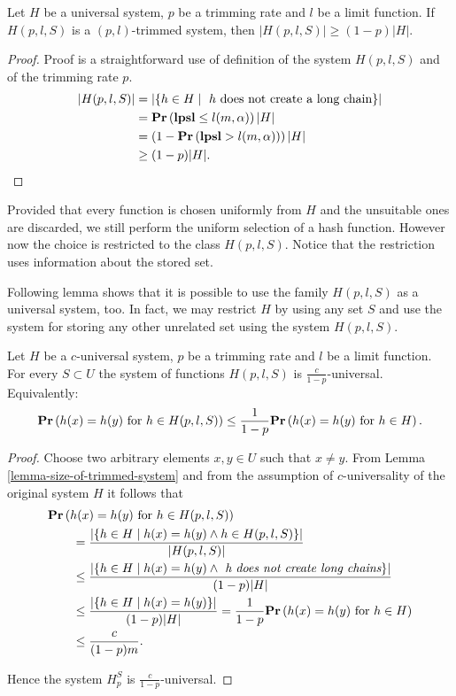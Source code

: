 \begin{lemma}
\label{lemma-size-of-trimmed-system}
Let $H$ be a universal system, $p$ be a trimming rate and $l$ be a limit function. If $H(p, l, S)$ is a $(p, l)$-trimmed system, then $|H(p, l, S)| \geq (1 - p)|H|$.
\end{lemma}
\begin{proof}
Proof is a straightforward use of definition of the system $H(p, l, S)$ and of the trimming rate $p$.
\[
\begin{split}
|H(p, l, S)| 
	& = |\lbrace h \in H \mid \text{ $h$ does not create a long chain} \rbrace| \\
	& =\mathbf{Pr}\left(\mathbf{lpsl} \leq l(m, \alpha)\right) |H| \\
	& = \left(1 - \mathbf{Pr}\left(\mathbf{lpsl} > l(m, \alpha)\right)\right) |H| \\
	& \geq (1 - p)|H| \text{.}
\end{split}
\]
\end{proof}

Provided that every function is chosen uniformly from $H$ and the unsuitable ones are discarded, we still perform the uniform selection of a hash function. However now the choice is restricted to the class $H(p, l, S)$. Notice that the restriction uses information about the stored set.

Following lemma shows that it is possible to use the family $H(p, l, S)$ as a universal system, too. In fact, we may restrict $H$ by using any set $S$ and use the system for storing any other unrelated set using the system $H(p, l, S)$.
\begin{theorem}
\label{theorem-p-trimmed-is-universal}
Let $H$ be a $c$-universal system, $p$ be a trimming rate and $l$ be a limit function. For every $S \subset U$ the system of functions $H(p, l, S)$ is $\frac{c}{1 - p}$-universal. Equivalently:
\[
	\mathbf{Pr}\left(h(x) = h(y) \text{ for } h \in H(p, l, S)\right) \leq \frac{1}{1 - p} \mathbf{Pr}\left(h(x) = h(y) \text{ for } h \in H\right) \text{.}
\]
\end{theorem}
\begin{proof}
Choose two arbitrary elements $x, y \in U$ such that $x \neq y$. From Lemma \ref{lemma-size-of-trimmed-system} and from the assumption of $c$-universality of the original system $H$ it follows that 
\[
\begin{split}
& \mathbf{Pr}\left(h(x) = h(y) \text{ for } h \in H(p, l, S)\right)  \\
	& \qquad =  \frac{|\{ h \in H \mid h(x) = h(y) \wedge h \in H(p, l, S)\}|}{|H(p, l, S)|} \\
	& \qquad \leq \frac{|\{ h \in H \mid h(x) = h(y) \wedge \textit{ h does not create long chains} \}|}{(1 - p)|H|} \\ 
	& \qquad \leq \frac{|\{ h \in H \mid h(x) = h(y) \}|}{(1 - p)|H|} = \frac{1}{1 - p} \mathbf{Pr}\left(h(x) = h(y) \text{ for } h \in H\right) \\
	& \qquad \leq \frac{c}{(1 - p) m} \text{.}
\end{split}
\]

Hence the system $H_p^S$ is $\frac{c}{1 - p}$-universal.
\end{proof}

